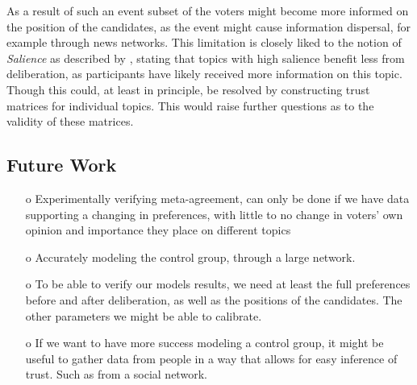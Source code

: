 As a result of such an event subset of the voters might become more informed on the position of
the candidates, as the event might cause information dispersal, for example
through news networks. This limitation is closely liked to the notion of
\textit{Salience} as described by
\citet{listDeliberationSinglePeakednessPossibility2013}, stating that topics
with high salience benefit less from deliberation, as participants have likely
received more information on this topic. Though this could, at least in
principle, be resolved by constructing trust matrices for individual topics.
This would raise further questions as to the validity of these matrices.



\subsection{Future Work}


\begin{itemize}
	\item [o] Experimentally verifying meta-agreement, can only be done if we have data supporting a changing in preferences, with little to no change in voters' own opinion and importance they place on different topics
	\item [o] Accurately modeling the control group, through a large network.
	\item[o] To be able to verify our models results, we need at least the full preferences before and after deliberation, as well as the positions of the candidates. The other parameters we might be able to calibrate.
	\item[o] If we want to have more success modeling a control group, it might be useful to gather data from people in a way that allows for easy inference of trust. Such as from a social network.
\end{itemize}
